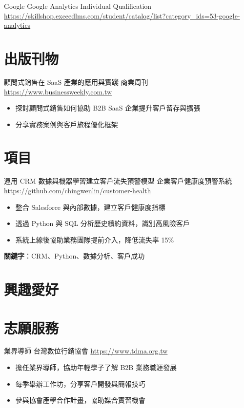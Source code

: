 \documentclass[a4paper, serif, 10pt]{moderncv}
\begin{document}
        {Google}
        {Google Analytics Individual Qualification}
        {\url{https://skillshop.exceedlms.com/student/catalog/list?category\_ids=53-google-analytics}}
        {}
        {}
\section{出版刊物}

        {顧問式銷售在 SaaS 產業的應用與實踐}
        {商業周刊}
        {\url{https://www.businessweekly.com.tw}}
        {}
        {\begin{itemize}
\item 探討顧問式銷售如何協助 B2B SaaS 企業提升客戶留存與擴張
\item 分享實務案例與客戶旅程優化框架
\end{itemize}}
\section{項目}

        {運用 CRM 數據與機器學習建立客戶流失預警模型}
        {企業客戶健康度預警系統}
        {\url{https://github.com/chingwenlin/customer-health}}
        {}
        {\begin{itemize}
\item 整合 Salesforce 與內部數據，建立客戶健康度指標
\item 透過 Python 與 SQL 分析歷史續約資料，識別高風險客戶
\item 系統上線後協助業務團隊提前介入，降低流失率 15\%
\end{itemize}
\textbf{關鍵字}：CRM、Python、數據分析、客戶成功}
\section{興趣愛好}

\section{志願服務}

        {業界導師}
        {台灣數位行銷協會}
        {\url{https://www.tdma.org.tw}}
        {}
        {\begin{itemize}
\item 擔任業界導師，協助年輕學子了解 B2B 業務職涯發展
\item 每季舉辦工作坊，分享客戶開發與簡報技巧
\item 參與協會產學合作計畫，協助媒合實習機會
\end{itemize}}
    
\end{document}
